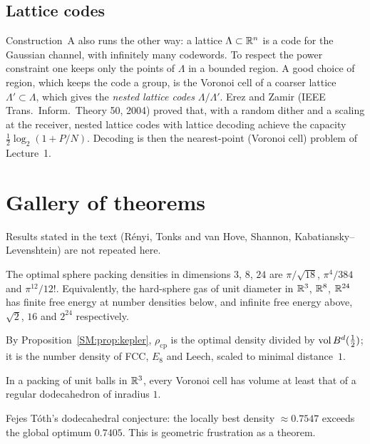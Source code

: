 \subsection{Lattice codes}

Construction~A also runs the other way: a lattice $\Lambda\subset\mathbb{R}^n$ is a code for the Gaussian channel,
with infinitely many codewords. To respect the power constraint one keeps only the points of $\Lambda$ in a
bounded region. A good choice of region, which keeps the code a group, is the Voronoi cell of a coarser lattice $\Lambda'\subset\Lambda$,
which gives the \emph{nested lattice codes} $\Lambda/\Lambda'$. Erez and Zamir (IEEE Trans.\ Inform.\ Theory 50,
2004) proved that, with a random dither and a scaling at the receiver, nested lattice codes with
lattice decoding achieve the capacity $\frac12\log_2(1+P/N)$. Decoding is then
the nearest-point (Voronoi cell) problem of Lecture~1.

\section{Gallery of theorems}
\label{SM:sec:gallery}

Results stated in the text (R\'enyi, Tonks and van Hove, Shannon, Kabatiansky--Levenshtein) are not
repeated here.

\begin{theorem}
The optimal sphere packing densities in dimensions $3$, $8$, $24$ are $\pi/\sqrt{18}$, $\pi^4/384$ and
$\pi^{12}/12!$. Equivalently, the hard-sphere gas of unit diameter in $\mathbb{R}^3$, $\mathbb{R}^8$, $\mathbb{R}^{24}$ has finite
free energy at number densities below, and infinite free energy above, $\sqrt2$, $16$ and $2^{24}$ respectively.
\end{theorem}
\noindent By Proposition~\ref{SM:prop:kepler}, $\rho_{\mathrm{cp}}$ is the optimal density divided by
$\operatorname{vol}B^d(\frac12)$; it is the number density of FCC, $E_8$ and Leech, scaled to minimal distance~$1$.

\begin{theorem}
In a packing of unit balls in $\mathbb{R}^3$, every Voronoi cell has volume at least that of a regular dodecahedron
of inradius $1$.
\end{theorem}
\noindent Fejes T\'oth's dodecahedral conjecture: the locally best density $\approx0.7547$ exceeds the global
optimum $0.7405$. This is geometric frustration as a theorem.

